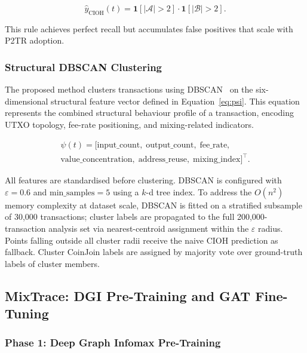 \documentclass[12pt,a4paper]{article}
\begin{document}
\begin{equation}
  \hat{y}_\text{CIOH}(t)
    = \mathbf{1}[|\mathcal{A}| > 2]
    \cdot \mathbf{1}[|\mathcal{B}| > 2].
  \label{eq:cioh}
\end{equation}

This rule achieves perfect recall but accumulates false
positives that scale with P2TR adoption.

\subsubsection{Structural DBSCAN Clustering}

The proposed method clusters transactions using
DBSCAN~\citep{ester1996} on the six-dimensional structural
feature vector defined in Equation~\eqref{eq:psi}.
This equation represents the combined structural behaviour
profile of a transaction, encoding UTXO topology,
fee-rate positioning, and mixing-related indicators.

\begin{multline}
  \psi(t) = \bigl[
    \text{input\_count},\;
    \text{output\_count},\;
    \text{fee\_rate},\\
    \text{value\_concentration},\;
    \text{address\_reuse},\;
    \text{mixing\_index}
  \bigr]^\top.
  \label{eq:psi}
\end{multline}

All features are standardised before clustering. DBSCAN
is configured with $\varepsilon = 0.6$ and
$\text{min\_samples} = 5$ using a $k$-d tree index.
To address the $O(n^2)$ memory complexity at dataset scale,
DBSCAN is fitted on a stratified subsample of 30,000
transactions; cluster labels are propagated to the full
200,000-transaction analysis set via nearest-centroid
assignment within the $\varepsilon$ radius. Points falling
outside all cluster radii receive the naive CIOH prediction
as fallback. Cluster CoinJoin labels are assigned by
majority vote over ground-truth labels of cluster members.

\subsection{MixTrace: DGI Pre-Training and GAT Fine-Tuning}
\label{sec:mixtrace_method}

\subsubsection{Phase 1: Deep Graph Infomax Pre-Training}
\end{document}
